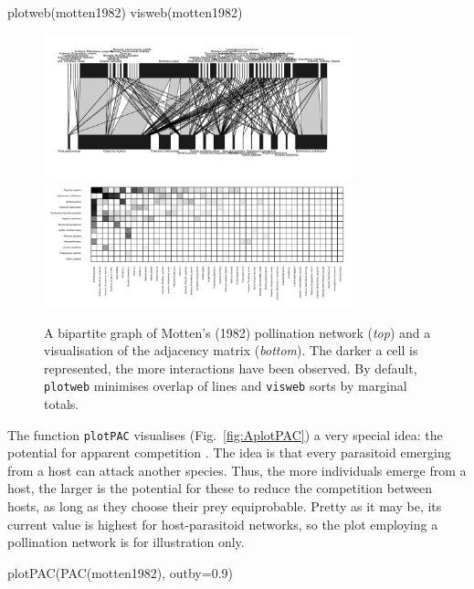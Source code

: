 \documentclass[a4paper, 11pt]{article}\usepackage[]{graphicx}\usepackage[]{color}
\makeatletter
\newcommand{\indR}[1]{\texttt{#1}\index{#1@\texttt{#1}}}   %
\makeatother
\begin{document}
\begin{Schunk}
\begin{Sinput}
plotweb(motten1982)
visweb(motten1982)
\end{Sinput}
\end{Schunk}
%
\begin{figure}
\centering
	\includegraphics[width=0.8\textwidth]{figures/motten1982_plotweb}
	\smallskip
	\includegraphics[width=0.8\textwidth]{figures/motten1982_visweb}
	\caption{A bipartite graph of Motten's (1982) pollination network (\emph{top}) and a visualisation of the adjacency matrix (\emph{bottom}). The darker a cell is represented, the more interactions have been observed. By default, \texttt{plotweb} minimises overlap of lines and \texttt{visweb} sorts by marginal totals.}
	\label{fig:Amotten}
\end{figure}



The function \indR{plotPAC} visualises  (Fig.~\ref{fig:AplotPAC}) a very special idea: the potential for apparent competition \citep{Morris2005}. The idea is that every parasitoid emerging from a host can attack another species. Thus, the more individuals emerge from a host, the larger is the potential for these to reduce the competition between hosts, as long as they choose their prey equiprobable. Pretty as it may be, its current value is highest for host-parasitoid networks, so the plot employing a pollination network is for illustration only.
\begin{Schunk}
\begin{Sinput}
plotPAC(PAC(motten1982), outby=0.9)
\end{Sinput}
\end{Schunk}
\end{document}
